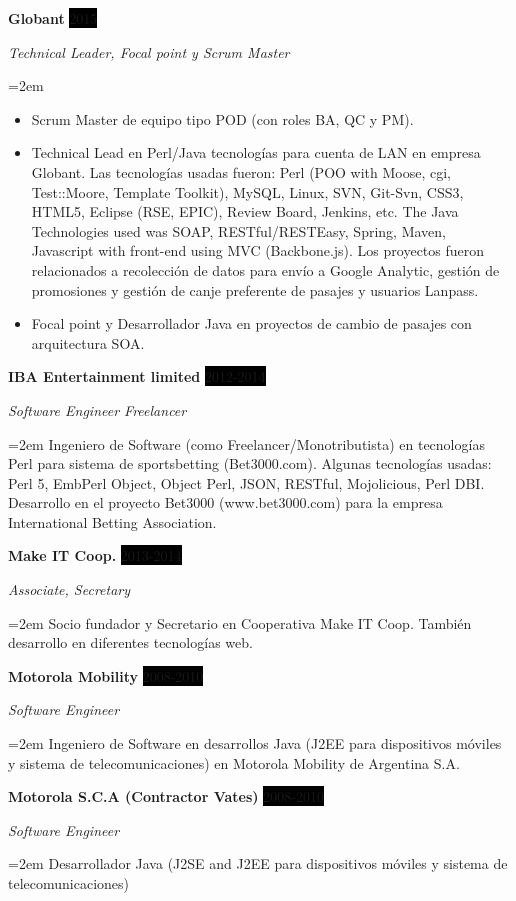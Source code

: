 \documentclass[paper=a4,fontsize=11pt]{scrartcl} %
\newcommand{\sepspace}{\vspace*{1em}}		%
\newcommand{\EducationEntry}[4]{
		\noindent \textbf{#1} \hfill      %
		\colorbox{Black}{%
			\parbox{6em}{%
			\hfill\color{White}#2}} \par  %
		\noindent \textit{#3} \par        %
		\noindent\hangindent=2em\hangafter=0 \small #4 %
		\normalsize \par}
\newcommand{\WorkEntry}[4]{				  %
		\noindent \textbf{#1} \hfill      %
		\colorbox{Black}{\color{White}#2} \par  %
		\noindent \textit{#3} \par              %
		\noindent\hangindent=2em\hangafter=0 \small #4 %
		\normalsize \par}
\begin{document}
\WorkEntry{Globant}{2015}{Technical Leader, Focal point y Scrum Master}
{
\begin{itemize}
\item Scrum Master de equipo tipo POD (con roles BA, QC y PM).
\item Technical Lead en Perl/Java tecnologías para cuenta de LAN en empresa Globant. Las tecnologías usadas fueron: Perl (POO with Moose, cgi, Test::Moore, Template Toolkit), MySQL, Linux, SVN, Git-Svn, CSS3, HTML5, Eclipse (RSE, EPIC), Review Board, Jenkins, etc. The Java Technologies used was SOAP, RESTful/RESTEasy, Spring, Maven, Javascript with front-end using MVC (Backbone.js). Los proyectos fueron  relacionados a recolección de datos para envío a Google Analytic, gestión de promosiones y gestión de canje preferente de pasajes y usuarios Lanpass.
\item Focal point y Desarrollador Java en proyectos de cambio de pasajes con arquitectura SOA.
\end{itemize}
}

\sepspace

\WorkEntry{IBA Entertainment limited}{2012-2014}{Software Engineer Freelancer}
{Ingeniero de Software (como Freelancer/Monotributista) en tecnologías Perl para sistema de sportsbetting (Bet3000.com). Algunas tecnologías usadas: Perl 5, EmbPerl Object, Object Perl, JSON, RESTful, Mojolicious, Perl DBI. Desarrollo en el proyecto Bet3000 (www.bet3000.com) para la empresa International Betting Association.}

\sepspace

\WorkEntry{Make IT Coop.}{2013-2014}{Associate, Secretary}{
Socio fundador y Secretario en Cooperativa Make IT Coop. También desarrollo en diferentes tecnologías web.}

\sepspace

\WorkEntry{Motorola Mobility}{2008-2010}{Software Engineer}
{Ingeniero de Software en desarrollos Java (J2EE para dispositivos móviles y sistema de telecomunicaciones) en Motorola Mobility de Argentina S.A.}

\sepspace

\WorkEntry{Motorola S.C.A (Contractor Vates)}{2008-2010}{Software Engineer}
{Desarrollador Java (J2SE and J2EE para dispositivos móviles y sistema de telecomunicaciones)}
\end{document}
